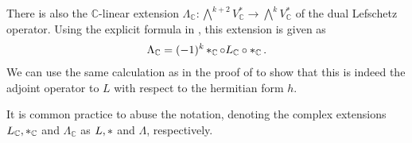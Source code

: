 There is also the $\mathbb{C}$-linear extension 
$\Lambda_\mathbb{C}: \bigwedge^{k+2}V_\mathbb{C}^*\rightarrow \bigwedge^{k} V_\mathbb{C}^*$
of the dual Lefschetz operator. Using the explicit formula in 
, this extension is given as
\begin{align*}
	\Lambda_\mathbb{C} = (-1)^k \operatorname{\ast}_\mathbb{C} \circ L_\mathbb{C} \circ \operatorname{\ast}_\mathbb{C}.
\end{align*}
We can use the same calculation as in the proof of  
to show that this is indeed the adjoint operator to $L$ with respect to the hermitian form $h$.
\begin{nota}
	It is common practice to abuse the notation, denoting the complex extensions 
	$L_\mathbb{C},\operatorname{\ast}_\mathbb{C}$ and $\Lambda_\mathbb{C}$ as $L, \operatorname{\ast}$ 
	and $\Lambda$, respectively.
\end{nota}
